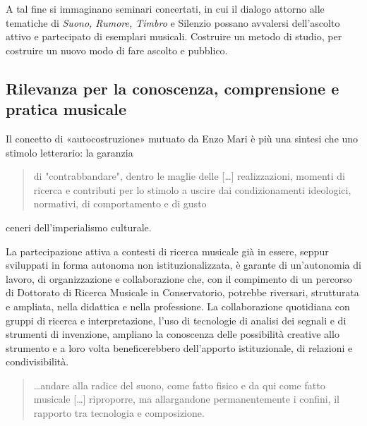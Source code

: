 \documentclass{gs-adonis}
\begin{document}
A tal fine si immaginano seminari concertati, in cui il dialogo attorno alle
tematiche di \emph{Suono, Rumore, Timbro} e Silenzio possano avvalersi dell'ascolto
attivo e partecipato di esemplari musicali. Costruire un metodo di studio, per
costruire un nuovo modo di fare ascolto e pubblico.

\subsection{Rilevanza per la conoscenza, comprensione e pratica musicale}
Il concetto di «autocostruzione» mutuato da Enzo Mari \cite{mari2002} è più una
sintesi che uno stimolo letterario: la garanzia

\begin{quote}
  di "contrabbandare", dentro le maglie delle […] realizzazioni, momenti di
  ricerca e contributi per lo stimolo a uscire dai condizionamenti ideologici,
  normativi, di comportamento e di gusto
\end{quote}

ceneri dell'imperialismo culturale.

La partecipazione attiva a contesti di ricerca musicale già in essere, seppur
sviluppati in forma autonoma non istituzionalizzata, è garante di un'autonomia
di lavoro, di organizzazione e collaborazione che, con il compimento di un
percorso di Dottorato di Ricerca Musicale in Conservatorio, potrebbe riversari,
strutturata e ampliata, nella didattica e nella professione. La collaborazione
quotidiana con gruppi di ricerca e interpretazione, l'uso di tecnologie di
analisi dei segnali e di strumenti di invenzione, ampliano la conoscenza
delle possibilità creative allo strumento e a loro volta beneficerebbero
dell'apporto istituzionale, di relazioni e condivisibilità.

\begin{quote}
  …andare alla radice del suono, come fatto fisico e da qui come fatto musicale
  […] riproporre, ma allargandone permanentemente i confini, il rapporto tra
  tecnologia e composizione.
\end{quote}

\end{document}
